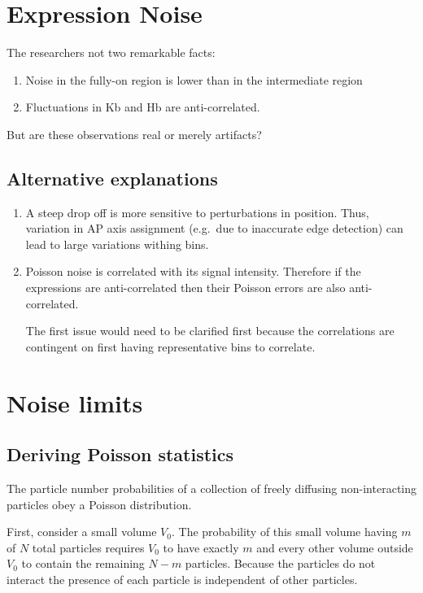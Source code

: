 \documentclass{article}
\begin{document}
    
\section{Expression Noise}
    The researchers not two remarkable facts:
    \begin{enumerate}
        \item Noise in the fully-on region is lower than in the intermediate region
        \item Fluctuations in Kb and Hb are anti-correlated. 
    \end{enumerate}
    
    But are these observations real or merely artifacts?
    
    \subsection{Alternative explanations}
    \begin{enumerate}
        \item A steep drop off is more sensitive to perturbations in position. Thus, variation in AP axis assignment (e.g.\ due to inaccurate edge detection) can lead to large variations withing bins.
        \item Poisson noise is correlated with its signal intensity. Therefore if the expressions are anti-correlated then their Poisson errors are also anti-correlated. 
        
        The first issue would need to be clarified first because the correlations are contingent on first having representative bins to correlate.
    \end{enumerate}
    
    
\section{Noise limits}

    \subsection{Deriving Poisson statistics}
    The particle number probabilities of a collection of freely diffusing non-interacting particles obey a Poisson distribution.
    
    First, consider a small volume $V_0$. The probability of this small volume having $m$ of $N$ total particles requires $V_0$ to have exactly $m$ and every other volume outside $V_0$ to contain the remaining $N-m$ particles. Because the particles do not interact the presence of each particle is independent of other particles.
    
\end{document}

